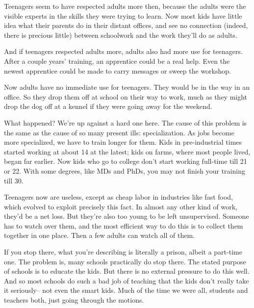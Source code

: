 Teenagers seem
                  to have respected adults more then, because the adults were
                  the visible experts in the skills they were trying to learn.
                  Now most kids have little idea what their parents do in their
                  distant offices, and see no connection (indeed, there is
                  precious little) between schoolwork and the work they'll do as
                  adults.

And if teenagers respected adults more,
                  adults also had more use for teenagers. After a couple years'
                  training, an apprentice could be a real help. Even the newest
                  apprentice could be made to carry messages or sweep the
                  workshop.

Now adults have no immediate use for
                  teenagers. They would be in the way in an office. So they drop
                  them off at school on their way to work, much as they might
                  drop the dog off at a kennel if they were going away for the
                  weekend.

What happened? We're up against a hard one
                  here. The cause of this problem is the same as the cause of so
                  many present ills: specialization. As jobs become more
                  specialized, we have to train longer for them. Kids in
                  pre-industrial times started working at about 14 at the
                  latest; kids on farms, where most people lived, began far
                  earlier. Now kids who go to college don't start working
                  full-time till 21 or 22. With some degrees, like MDs and PhDs,
                  you may not finish your training till 30.

Teenagers
                  now are useless, except as cheap labor in industries like fast
                  food, which evolved to exploit precisely this fact. In almost
                  any other kind of work, they'd be a net loss. But they're also
                  too young to be left unsupervised. Someone has to watch over
                  them, and the most efficient way to do this is to collect them
                  together in one place. Then a few adults can watch all of
                  them.

If you stop there, what you're describing is
                  literally a prison, albeit a part-time one. The problem is,
                  many schools practically do stop there. The stated purpose of
                  schools is to educate the kids. But there is no external
                  pressure to do this well. And so most schools do such a bad
                  job of teaching that the kids don't really take it seriously--
                  not even the smart kids. Much of the time we were all,
                  students and teachers both, just going through the motions.

